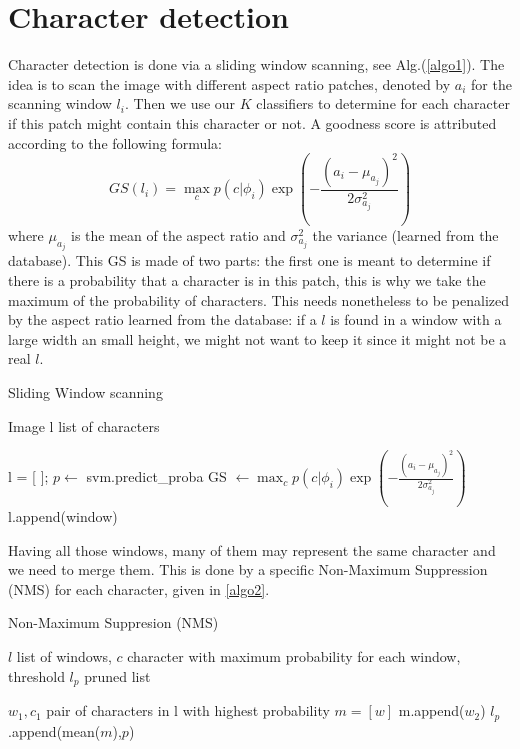 \documentclass[10pt,a4paper]{article}
\begin{document}
\section{Character detection}

Character detection is done via a sliding window scanning, see Alg.(\ref{algo1}). The idea is to scan the image with different aspect ratio patches, denoted by $a_i$ for the scanning window $l_i$. Then we use our $K$ classifiers to determine for each character if this patch might contain this character or not. A goodness score is attributed according to the following formula:
\begin{equation}
GS(l_i) = \max_c p(c|\phi_i) \exp\left( - \frac{(a_i - \mu_{a_j})^2}{2\sigma_{a_j}^2} \right)
\label{eq:}
\end{equation}
where $\mu_{a_j}$ is the mean of the aspect ratio and $\sigma_{a_j}^2$ the variance (learned from the database). This GS is made of two parts: the first one is meant to determine if there is a probability that a character is in this patch, this is why we take the maximum of the probability of characters. This needs nonetheless to be penalized by the aspect ratio learned from the database: if a $l$ is found in a window with a large width an small height, we might not want to keep it since it might not be a real $l$. \\

\begin{algorithm}
\caption{Sliding Window scanning}
\label{algo1}
\begin{algorithmic}
\Require Image
\Ensure l list of characters

\State l = [ ]; 
	\State $p \leftarrow$ svm.predict\_proba
	\State GS $\leftarrow \max_c p(c|\phi_i) \exp\left( - \frac{(a_i - \mu_{a_j})^2}{2\sigma_{a_j}^2} \right)$
		\State l.append(window) 
	\EndIf
\EndFor
\end{algorithmic}
\end{algorithm}

Having all those windows, many of them may represent the same character and we need to merge them. This is done by a specific Non-Maximum Suppression (NMS) for each character, given in \ref{algo2}. 
\begin{algorithm}
\caption{Non-Maximum Suppresion (NMS)}
\label{algo2}
\begin{algorithmic}
\Require $l$ list of windows, $c$ character with maximum probability for each window, threshold
\Ensure $l_p$ pruned list

	\State $w_1, c_1$ pair of characters in l with highest probability
	\State $m = [w]$
			m.append($w_2$)
		\EndIf
	\EndFor
	\State $l_p$.append(mean($m$),$p$)
\EndWhile
\end{algorithmic}
\end{algorithm}
\end{document}
